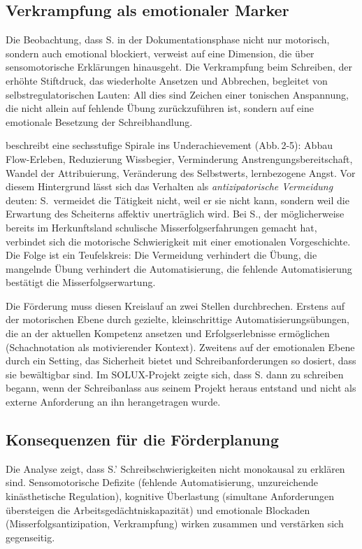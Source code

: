 \documentclass[ngerman, a4paper]{article}
\begin{document}
\subsection{Verkrampfung als emotionaler Marker}

Die Beobachtung, dass S. in der Dokumentationsphase nicht nur motorisch, sondern
auch emotional blockiert, verweist auf eine Dimension, die über sensomotorische
Erklärungen hinausgeht. Die Verkrampfung beim Schreiben, der erhöhte Stiftdruck,
das wiederholte Ansetzen und Abbrechen, begleitet von selbstregulatorischen Lauten:
All dies sind Zeichen einer tonischen Anspannung, die nicht allein auf fehlende
Übung zurückzuführen ist, sondern auf eine emotionale Besetzung der Schreibhandlung.

\textcite[S.\,70--72]{lehwald2017motivation} beschreibt eine sechsstufige
Spirale ins Underachievement (Abb.\,2-5): Abbau Flow-Erleben, Reduzierung
Wissbegier, Verminderung Anstrengungsbereitschaft, Wandel der Attribuierung,
Veränderung des Selbstwerts, lernbezogene Angst. Vor diesem Hintergrund
lässt sich das Verhalten als \textit{antizipatorische Vermeidung} deuten:
S.\ vermeidet die Tätigkeit nicht, weil er sie nicht kann, sondern weil
die Erwartung des Scheiterns affektiv unerträglich wird. Bei S., der
möglicherweise bereits im Herkunftsland schulische Misserfolgserfahrungen
gemacht hat, verbindet sich die motorische Schwierigkeit mit einer
emotionalen Vorgeschichte. Die Folge ist ein Teufelskreis: Die Vermeidung
verhindert die Übung, die mangelnde Übung verhindert die Automatisierung,
die fehlende Automatisierung bestätigt die Misserfolgserwartung.

Die Förderung muss diesen Kreislauf an zwei Stellen durchbrechen. Erstens auf der
motorischen Ebene durch gezielte, kleinschrittige Automatisierungsübungen, die an
der aktuellen Kompetenz ansetzen und Erfolgserlebnisse ermöglichen (Schachnotation
als motivierender Kontext). Zweitens auf der emotionalen Ebene durch ein Setting, das
Sicherheit bietet und Schreibanforderungen so dosiert, dass sie bewältigbar sind. Im
SOLUX-Projekt zeigte sich, dass S. dann zu schreiben begann, wenn der Schreibanlass
aus seinem Projekt heraus entstand und nicht als externe Anforderung an ihn
herangetragen wurde.

\subsection{Konsequenzen für die Förderplanung}

Die Analyse zeigt, dass S.' Schreibschwierigkeiten nicht monokausal zu erklären sind.
Sensomotorische Defizite (fehlende Automatisierung, unzureichende kinästhetische
Regulation), kognitive Überlastung (simultane Anforderungen übersteigen die
Arbeitsgedächtniskapazität) und emotionale Blockaden (Misserfolgsantizipation,
Verkrampfung) wirken zusammen und verstärken sich gegenseitig.
\end{document}
